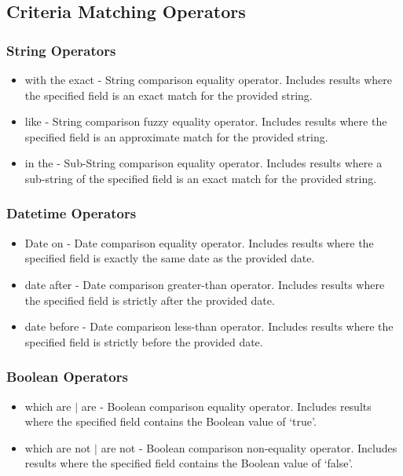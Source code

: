 \subsection{Criteria Matching Operators}
\subsubsection{String Operators}
\label{sub:DerpOperators}
\begin{itemize}
\item with the exact - String comparison equality operator. Includes results where the specified field is an exact match for the provided string.
\item like - String comparison fuzzy equality operator. Includes results where the specified field is an approximate match for the provided string.
\item in the - Sub-String comparison equality operator. Includes results where a sub-string of the specified field is an exact match for the provided string.
\end{itemize}
\subsubsection{Datetime Operators}
\begin{itemize}
\item Date on - Date comparison equality operator. Includes results where the specified field is exactly the same date as the provided date.
\item date after - Date comparison greater-than operator. Includes results where the specified field is strictly after the provided date.
\item date before - Date comparison less-than operator. Includes results where the specified field is strictly before the provided date.
\end{itemize}
\subsubsection{Boolean Operators}
\begin{itemize}
\item which are $|$ are - Boolean comparison equality operator. Includes results where the specified field contains the Boolean value of `true'.
\item which are not $|$ are not - Boolean comparison non-equality operator. Includes results where the specified field contains the Boolean value of `false'.
\end{itemize}
